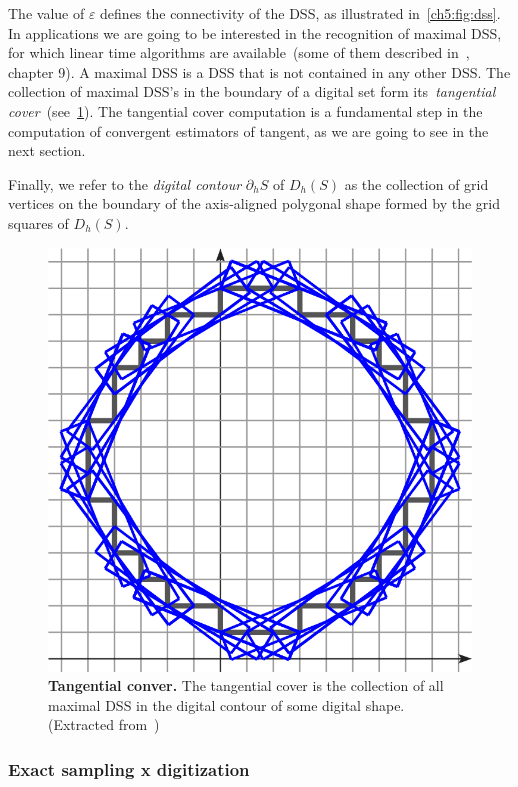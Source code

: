 The value of $\varepsilon$ defines the connectivity of the DSS, as illustrated in~\cref{ch5:fig:dss}. In applications we are going to be interested in the recognition of maximal DSS, for which linear time algorithms are available~(some of them described in~\cite{klette04digital}, chapter 9). A maximal DSS is a DSS that is not contained in any other DSS. The collection of maximal DSS's in the boundary of a digital set form its~\emph{tangential cover}~(see~\cref{ch5:fig:tangential-cover}). The tangential cover computation is a fundamental step in the computation of convergent estimators of tangent, as we are going to see in the next section.

Finally, we refer to the \emph{digital contour} $\partial_h S$ of $D_h(S)$ as the collection of grid vertices on the boundary of the axis-aligned polygonal shape formed by the grid squares of $D_h(S)$.

\begin{figure}
\center
\includegraphics[scale=1]{figures/chapter-digital/dss/tangential-cover.png}
\caption{\textbf{Tangential conver.} The tangential cover is the collection of all maximal DSS in the digital contour of some digital shape. (Extracted from~\cite{})}
\label{ch5:fig:tangential-cover}
\end{figure}


\subsubsection{Exact sampling x digitization}

